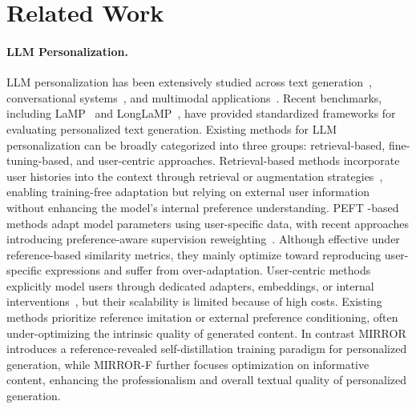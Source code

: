 \documentclass{article} %
\begin{document}
\section{Related Work}
\label{Related Work}

\paragraph{LLM Personalization.}
LLM personalization has been extensively studied across text generation~\citep{rolecde,rolellm}, conversational systems~\citep{coser,Conversation1}, and multimodal applications~\citep{mmpersonal}. Recent benchmarks, including LaMP~\citep{lamp} and LongLaMP~\citep{longlamp}, have provided standardized frameworks for evaluating personalized text generation. Existing methods for LLM personalization can be broadly categorized into three groups: retrieval-based, fine-tuning-based, and user-centric approaches. Retrieval-based methods incorporate user histories into the context through retrieval or augmentation strategies~\citep{ragbase,rag1,rag2,harness,skill,office2,popi}, enabling training-free adaptation but relying on external user information without enhancing the model's internal preference understanding. PEFT
-based methods adapt model parameters using user-specific data, with recent approaches introducing preference-aware supervision reweighting~\citep{PerCE,nextquill}. Although effective under reference-based similarity metrics, they mainly optimize toward reproducing user-specific expressions and suffer from over-adaptation. User-centric methods explicitly model users through dedicated adapters\citep{oppu,OPDpersona}, embeddings, or internal interventions~\citep{pplug,attention,hiddenpref}, but their scalability is limited because of high costs. Existing methods prioritize reference imitation or external preference conditioning, often under-optimizing the intrinsic quality of generated content. In contrast MIRROR introduces a reference-revealed self-distillation training paradigm for personalized generation, while MIRROR-F further focuses optimization on informative content, enhancing the professionalism and overall textual quality of personalized generation.
\end{document}
